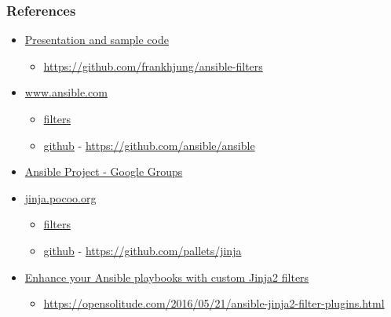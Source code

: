 \documentclass[pdf]{beamer}
\begin{document}
\begin{frame}
  \frametitle{References}
  \begin{itemize}
    \item
      \href{https://github.com/frankhjung/ansible-filters}{Presentation and sample code}
      \begin{itemize}
        \item \url{https://github.com/frankhjung/ansible-filters}
      \end{itemize}
    \item
      \href{https://www.ansible.com/}{www.ansible.com}
      \begin{itemize}
        \item \href{http://docs.ansible.com/ansible/playbooks_filters.html}{filters}
        \item \href{https://github.com/ansible/ansible}{github} - \url{https://github.com/ansible/ansible}
      \end{itemize}
    \item
      \href{https://groups.google.com/d/forum/ansible-project}{Ansible Project - Google Groups}
    \item
      \href{http://jinja.pocoo.org/}{jinja.pocoo.org}
      \begin{itemize}
        \item \href{http://jinja.pocoo.org/docs/2.9/templates}{filters}
        \item \href{https://github.com/pallets/jinja}{github} - \url{https://github.com/pallets/jinja}
      \end{itemize}
    \item
      \href{https://opensolitude.com/2016/05/21/ansible-jinja2-filter-plugins.html}{Enhance your Ansible playbooks with custom Jinja2 filters}
      \begin{itemize}
        \item \url{https://opensolitude.com/2016/05/21/ansible-jinja2-filter-plugins.html}
      \end{itemize}
  \end{itemize}
\end{frame}
\end{document}
